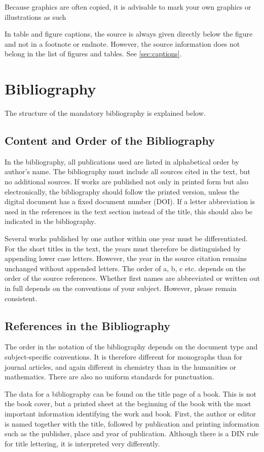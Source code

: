 Because graphics are often copied, it is advisable to mark your own graphics or 
illustrations as such

In table and figure captions, the source is always given directly below the 
figure and not in a footnote or endnote. However, the source information does 
not belong in the list of figures and tables. See \cref{sec:captions}.

\section{Bibliography}
The structure of the mandatory bibliography is explained below.

\subsection{Content and Order of the Bibliography}
\label{sec:bib-content}
In the bibliography, all publications used are listed in alphabetical order by 
author's name. The bibliography must include all sources cited in the text, but 
no additional sources. If works are published not only in printed form but also 
electronically, the bibliography should follow the printed version, unless the 
digital document has a fixed document number (DOI). If a letter abbreviation is 
used in the references in the text section instead of the title, this should 
also be indicated in the bibliography.

Several works published by one author within one year must be differentiated. 
For the short titles in the text, the years must therefore be distinguished by 
appending lower case letters. However, the year in the source citation remains 
unchanged without appended letters. The order of a, b, c etc. depends on the 
order of the source references. Whether first names are abbreviated or written 
out in full depends on the conventions of your subject. However, please remain 
consistent.

\subsection{References in the Bibliography}
The order in the notation of the bibliography depends on the document type and 
subject-specific conventions. It is therefore different for monographs than for 
journal articles, and again different in chemistry than in the humanities or 
mathematics. There are also no uniform standards for punctuation.

The data for a bibliography can be found on the title page of a book. This is 
not the book cover, but a printed sheet at the beginning of the book with the 
most important information identifying the work and book. First, the author or 
editor is named together with the title, followed by publication and printing 
information such as the publisher, place and year of publication. Although there 
is a DIN rule for title lettering, it is interpreted very differently.

